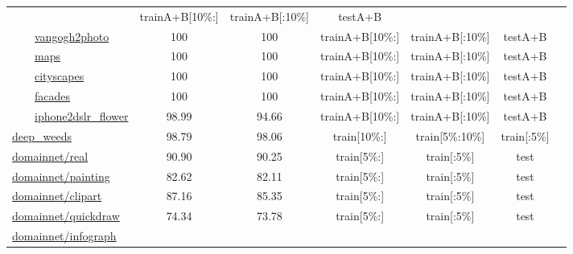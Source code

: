 \documentclass{article} \usepackage{iclr2023_conference,times}
\begin{document}
\begin{table*}[h]
\begin{tabular}{lcccccc}
 &  {\tiny trainA+B[10\%:]} & {\tiny trainA+B[:10\%]} & {\tiny testA+B}&
 \citep{Zhu2017UnpairedIT}
 \\
\ \ \ \ \href{https://www.tensorflow.org/datasets/catalog/cycle_gan#vangogh2photo}{vangogh2photo}
&  100  &  100
 &  {\tiny trainA+B[10\%:]} & {\tiny trainA+B[:10\%]} & {\tiny testA+B}&
 \citep{Zhu2017UnpairedIT}
 \\
\ \ \ \ \href{https://www.tensorflow.org/datasets/catalog/cycle_gan#maps}{maps}
&  100  &  100
 &  {\tiny trainA+B[10\%:]} & {\tiny trainA+B[:10\%]} & {\tiny testA+B}&
 \citep{Zhu2017UnpairedIT}
 \\
\ \ \ \ \href{https://www.tensorflow.org/datasets/catalog/cycle_gan#cityscapes}{cityscapes}
&  100  &  100
 &  {\tiny trainA+B[10\%:]} & {\tiny trainA+B[:10\%]} & {\tiny testA+B}&
 \citep{Zhu2017UnpairedIT}
 \\
\ \ \ \ \href{https://www.tensorflow.org/datasets/catalog/cycle_gan#facades}{facades}
&  100  &  100
 &  {\tiny trainA+B[10\%:]} & {\tiny trainA+B[:10\%]} & {\tiny testA+B}&
 \citep{Zhu2017UnpairedIT}
 \\
\ \ \ \ \href{https://www.tensorflow.org/datasets/catalog/cycle_gan#iphone2dslr_flower}{iphone2dslr\_flower}
&  98.99  &  94.66
 &  {\tiny trainA+B[10\%:]} & {\tiny trainA+B[:10\%]} & {\tiny testA+B}&
 \citep{Zhu2017UnpairedIT}
 \\
\href{https://www.tensorflow.org/datasets/catalog/deep_weeds}{deep\_weeds}
&  98.79  &  98.06
 & train[{\tiny10\%:}] & train[{\tiny5\%:10\%}] & train[{\tiny:5\%}] &
 \citep{Olsen2019DeepWeedsAM}
 \\
\href{https://www.tensorflow.org/datasets/catalog/domainnet#real}{domainnet/real}
&  90.90  &  90.25
 & train[{\tiny5\%:}] & train[{\tiny:5\%}] & test &
 \citep{Peng2019MomentMF}
 \\
\href{https://www.tensorflow.org/datasets/catalog/domainnet#painting}{domainnet/painting}
&  82.62  &  82.11
 & train[{\tiny5\%:}] & train[{\tiny:5\%}] & test &
 \citep{Peng2019MomentMF}
 \\
\href{https://www.tensorflow.org/datasets/catalog/domainnet#clipart}{domainnet/clipart}
&  87.16  &  85.35
 & train[{\tiny5\%:}] & train[{\tiny:5\%}] & test &
 \citep{Peng2019MomentMF}
 \\
\href{https://www.tensorflow.org/datasets/catalog/domainnet#quickdraw}{domainnet/quickdraw}
&  74.34  &  73.78
 & train[{\tiny5\%:}] & train[{\tiny:5\%}] & test & 
 \citep{Peng2019MomentMF}
 \\
\href{https://www.tensorflow.org/datasets/catalog/domainnet#infograph}{domainnet/infograph}

\end{tabular}
\end{table*}
\end{document}
